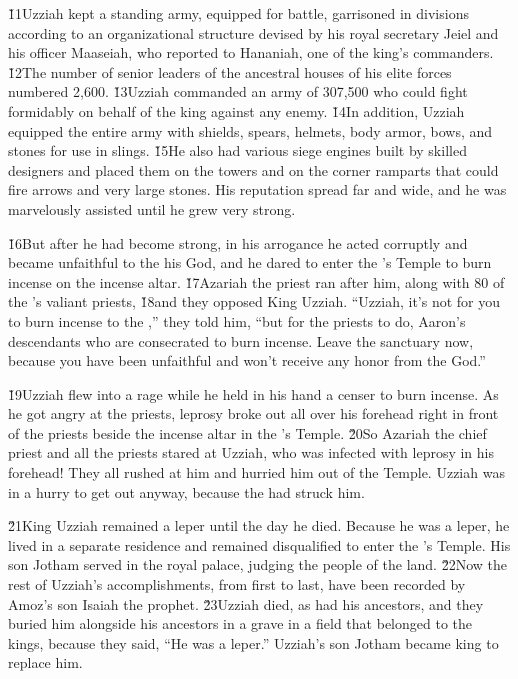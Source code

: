 \v{11}Uzziah kept a standing army, equipped for battle, garrisoned in divisions according to an organizational structure devised by his royal secretary Jeiel and his officer Maaseiah, who reported to Hananiah, one of the king's commanders. \v{12}The number of senior leaders of the ancestral houses of his elite forces numbered 2,600. \v{13}Uzziah commanded an army of 307,500 who could fight formidably on behalf of the king against any enemy. \v{14}In addition, Uzziah equipped the entire army with shields, spears, helmets, body armor, bows, and stones for use in slings. \v{15}He also had various siege engines built by skilled designers and placed them on the towers and on the corner ramparts that could fire arrows and very large stones. His reputation spread far and wide, and he was marvelously assisted until he grew very strong.

\v{16}But after he had become strong, in his arrogance he acted corruptly and became unfaithful to the  his God, and he dared to enter the 's Temple to burn incense on the incense altar. \v{17}Azariah the priest ran after him, along with 80 of the 's valiant priests, \v{18}and they opposed King Uzziah. ``Uzziah, it's not for you to burn incense to the ,'' they told him, ``but for the priests to do, Aaron's descendants who are consecrated to burn incense. Leave the sanctuary now, because you have been unfaithful and won't receive any honor from the  God.''

\v{19}Uzziah flew into a rage while he held in his hand a censer to burn incense. As he got angry at the priests, leprosy broke out all over his forehead right in front of the priests beside the incense altar in the 's Temple. \v{20}So Azariah the chief priest and all the priests stared at Uzziah, who was infected with leprosy in his forehead! They all rushed at him and hurried him out of the Temple. Uzziah was in a hurry to get out anyway, because the  had struck him.

\v{21}King Uzziah remained a leper until the day he died. Because he was a leper, he lived in a separate residence and remained disqualified to enter the 's Temple. His son Jotham served in the royal palace, judging the people of the land. \v{22}Now the rest of Uzziah's accomplishments, from first to last, have been recorded by Amoz's son Isaiah the prophet. \v{23}Uzziah died, as had his ancestors, and they buried him alongside his ancestors in a grave in a field that belonged to the kings, because they said, ``He was a leper.'' Uzziah's son Jotham became king to replace him.

